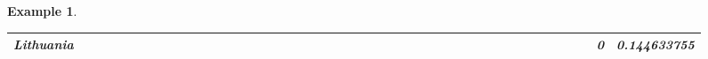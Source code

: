 \documentclass[a4paper,11pt]{report}
\newtheorem{example}[theorem]{Example}
\begin{document}
\begin{example}
\begin{appendices}
\begin{landscape}
\begin{longtable}{r|r|r|r|r|r|r|r|r|r|r|r|r|r|r|r|r|r|r|r|r|r|r|r|r|r|r|r|r|r|r|r|r|r|r|r|r|r|r|r|r|r|r|r|}
\multicolumn{1}{|r|}{\textbf{Lithuania}}             &                                       &                                       &                                          &                                       &                                       &                                                     &                                        &                                       &                                      &                                       &                                       &                                                &                                       &                                      &                                       &                                       &                                      &                                       &                                       &                                      &                                      &                                         &                                     &                                       &                                      &                                      &                                        &                                       &                                      &                                      &                                        &                                        &                                     &                                      &                                           &                                               &                                      &                                       &                                              &                                      &                                     & 0                                             & 0.144633755                             \\ \hline

\end{longtable}
\end{landscape}
\end{appendices}
\end{example}
\end{document}
